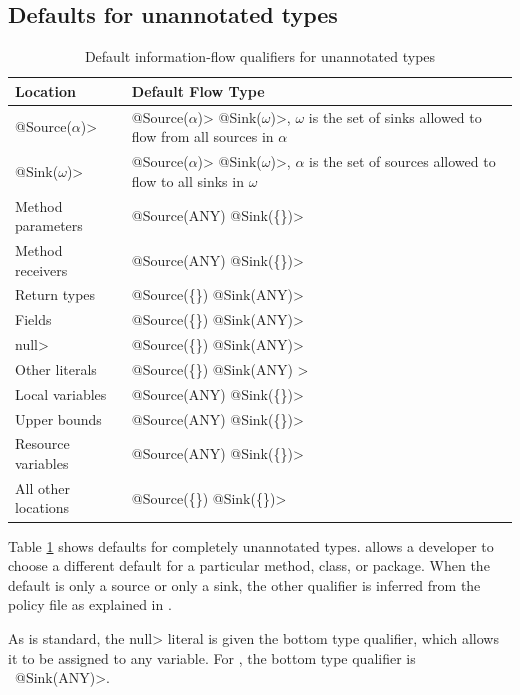 \subsection{Defaults for unannotated types}
\label{sec:unannotated-types}


\begin{table}
  \caption{Default information-flow qualifiers for unannotated types}
  \begin{tabular}{l l}
  \hline
    \bf{Location} & \bf{Default Flow Type}\\
  \hline
     \<@Source($\alpha$)>&\<@Source($\alpha$)>
       \<@Sink($\omega$)>,  $\omega$ is the set of  sinks allowed to flow from all sources in $\alpha$ \\
     \<@Sink($\omega$)>&\<@Source($\alpha$)>
       \<@Sink($\omega$)>, $\alpha$ is the set of  sources allowed to flow to all sinks in $\omega$ \\
    Method parameters & \<@Source(ANY) @Sink(\{\})>  \\
    Method receivers & \<@Source(ANY) @Sink(\{\})>  \\
    Return types &  \<@Source(\{\}) @Sink(ANY)> \\
    Fields &  \<@Source(\{\}) @Sink(ANY)> \\
    \<null> &  \<@Source(\{\}) @Sink(ANY)>\\
    Other literals & \<@Source(\{\}) @Sink(ANY) >\\
    Local variables &   \<@Source(ANY) @Sink(\{\})> \\
    Upper bounds &   \<@Source(ANY) @Sink(\{\})> \\
    Resource variables  &   \<@Source(ANY) @Sink(\{\})> \\
    All other locations & \<@Source(\{\}) @Sink(\{\})>\\
  
  \end{tabular}

  \label{tab:defaults}
\end{table}

Table \ref{tab:defaults} shows defaults for completely unannotated types.
\TheFlowChecker allows a developer to choose a different default for a
particular method, class, or package.
When the default is only a source or only a sink, the other qualifier is
inferred from the policy file as explained in
.


As is standard, the \<null> literal is given the bottom type qualifier, which allows it to be assigned to any variable.
For \theFlowChecker, the bottom type qualifier is \srcnone\  \<@Sink(ANY)>.



